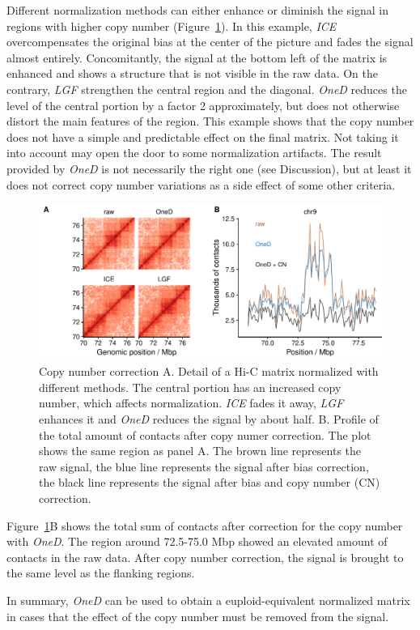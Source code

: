 \documentclass{bioinfo}
\begin{document}
Different normalization methods can either enhance or diminish the signal
in regions with higher copy number (Figure~\ref{fig:cnv_correction}). In
this example, \textit{ICE} overcompensates the original bias at the center
of the picture and fades the signal almost entirely. Concomitantly, the
signal at the bottom left of the matrix is enhanced and shows a structure
that is not visible in the raw data. On the contrary, \textit{LGF}
strengthen the central region and the diagonal. \textit{OneD} reduces the
level of the central portion by a factor 2 approximately, but does not
otherwise distort the main features of the region. This example shows that
the copy number does not have a simple and predictable effect on the final
matrix. Not taking it into account may open the door to some normalization
artifacts. The result provided by \textit{OneD} is not necessarily the
right one (see Discussion), but at least it does not correct copy number
variations as a side effect of some other criteria.

\begin{figure}
\centerline{\includegraphics[width=.5\textwidth]
  {img/figure_cnv_correction.pdf}}
\caption{
Copy number correction A. Detail of a Hi-C matrix normalized with
different methods. The central portion has an increased copy number, which
affects normalization. \textit{ICE} fades it away, \textit{LGF} enhances
it and \textit{OneD} reduces the signal by about half. B. Profile of the
total amount of contacts after copy numer correction. The plot shows the
same region as panel A. The brown line represents the raw signal, the blue
line represents the signal after bias correction, the black line
represents the signal after bias and copy number (CN) correction.}
\label{fig:cnv_correction}
\end{figure}

Figure~\ref{fig:cnv_correction}B shows the total sum of contacts after
correction for the copy number with \textit{OneD}. The region around
72.5-75.0 Mbp showed an elevated amount of contacts in the raw data. After
copy number correction, the signal is brought to the same level as the
flanking regions.

In summary, \textit{OneD} can be used to obtain a euploid-equivalent
normalized matrix in cases that the effect of the copy number must be
removed from the signal.
\end{document}
